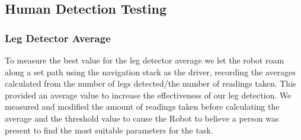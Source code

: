 \documentclass{article}
\begin{document}
	\subsection{Human Detection Testing}
	\subsubsection{Leg Detector Average}
	To measure the best value for the leg detector average we let the robot roam along a set path using the navigation stack as the driver, recording the averages calculated from the number of legs detected/the number of readings taken. This provided an average value to increase the effectiveness of our leg detection. We measured and modified the amount of readings taken before calculating the average and the threshold value to cause the Robot to believe a person was present to find the most suitable parameters for the task.
\end{document}
